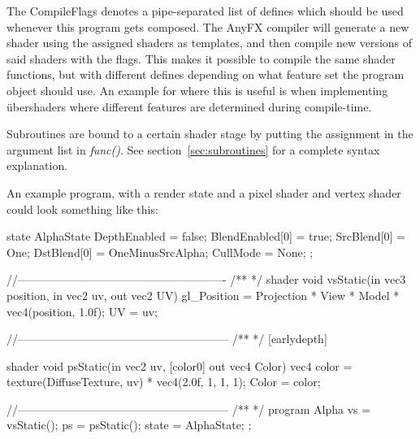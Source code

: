 \documentclass{article}
\begin{document}
The CompileFlags denotes a pipe-separated list of defines which should be used whenever this program gets composed. The AnyFX compiler will generate a new shader using the assigned shaders as templates, and then compile new versions of said shaders with the flags. This makes it possible to compile the same shader functions, but with different defines depending on what feature set the program object should use. An example for where this is useful is when implementing \"{u}bershaders where different features are determined during compile-time. 

Subroutines are bound to a certain shader stage by putting the assignment in the argument list in \textit{func()}. See section~\ref{sec:subroutines} for a complete syntax explanation.

\begin{table}[float]
\caption{Shader dependencies}
\label{table:shaderdeps}
\end{table}

An example program, with a render state and a pixel shader and vertex shader could look something like this:
\begin{CodeBox}
state AlphaState
{
	DepthEnabled = false;
	BlendEnabled[0] = true;
	SrcBlend[0] = One;
	DstBlend[0] = OneMinusSrcAlpha;
	CullMode = None;
};

//-------------------------------------------------------
/**
*/
shader
void
vsStatic(in vec3 position, in vec2 uv, out vec2 UV)
{
	gl_Position = Projection * View * Model * vec4(position, 1.0f);
	UV = uv;
}

//--------------------------------------------------------
/**
*/
[earlydepth]

shader
void 
psStatic(in vec2 uv, [color0] out vec4 Color)
{
	vec4 color = texture(DiffuseTexture, uv) * vec4(2.0f, 1, 1, 1);
	Color =  color;
}

//--------------------------------------------------------
/**
*/
program Alpha
{
	vs = vsStatic();
	ps = psStatic();
	state = AlphaState;
};
\end{CodeBox}
\end{document}

